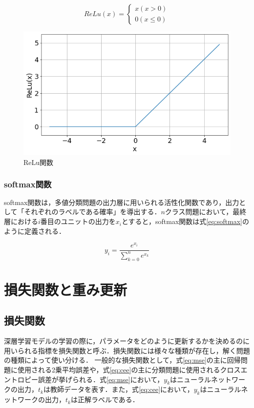 \documentclass[a4j, 11pt]{jreport}
\begin{document}
\begin{equation}
  ReLu(x)= \left \{
  \begin{array}{l}
  x　(x > 0)\\
  0　(x \leq 0)
  \end{array}
  \right.
  \label{eq:relu}
  \end{equation}

\begin{figure}[H]
  \centering
  \includegraphics[width=0.7\hsize, keepaspectratio]{images/relu.png}
  \caption{ReLu関数}
  \label{fig:relu}
 \end{figure}

\subsubsection{softmax関数}
softmax関数は，多値分類問題の出力層に用いられる活性化関数であり，出力として「それぞれのラベルである確率」を導出する．$n$クラス問題において，最終層における$i$番目のユニットの出力を$x_{i}$とすると，softmax関数は式\ref{eq:softmax}のように定義される．

\begin{equation}
 y_{i} = \frac{e^{x_{i}}}{\sum_{k=0}^{n}e^{x_{k}}}
 \label{eq:softmax}
\end{equation}

\newpage
\section{損失関数と重み更新}
\subsection{損失関数}
深層学習モデルの学習の際に，パラメータをどのように更新するかを決めるのに用いられる指標を損失関数と呼ぶ．損失関数には様々な種類が存在し，解く問題の種類によって使い分ける．
一般的な損失関数として，式\ref{eq:mse}の主に回帰問題に使用される2乗平均誤差や，式\ref{eq:cee}の主に分類問題に使用されるクロスエントロピー誤差が挙げられる．式\ref{eq:mse}において，$y_{k}$はニューラルネットワークの出力，$t_{k}$は教師データを表す．また，式\ref{eq:cee}において，$y_{k}$はニューラルネットワークの出力，$t_{k}$は正解ラベルである．
\end{document}
